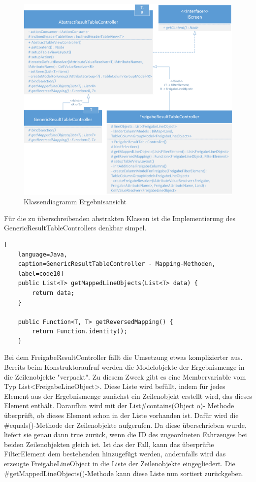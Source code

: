 \begin{figure}[H]
 \centering
 \includegraphics[width=1.0\textwidth]{grafiken/Class_ResultTable.png}
 \caption{Klassendiagramm Ergebnisansicht}
 \label{fig:tabelle4}
\end{figure}

Für die zu überschreibenden abstrakten Klassen ist die Implementierung des GenericResultTableControllers denkbar simpel.


\begin{lstlisting}[
    language=Java,
    caption=GenericResultTableController - Mapping-Methoden,
    label=code10]
	public List<T> getMappedLineObjects(List<T> data) {
		return data;
	}

	public Function<T, T> getReversedMapping() {
		return Function.identity();
	}
\end{lstlisting}

Bei dem FreigabeResultController fällt die Umsetzung etwas komplizierter aus. Bereits beim Konstruktoraufruf werden die Modelobjekte der Ergebnismenge in die Zeilenobjekte "verpackt". Zu diesem Zweck gibt es eine Membervariable vom Typ List<FreigabeLineObject>. Diese Liste wird befüllt, indem für jedes Element aus der Ergebnismenge zunächst ein Zeilenobjekt erstellt wird, das dieses Element enthält. Daraufhin wird mit der List\#contains(Object o)- Methode überprüft, ob dieses Element schon in der Liste vorhanden ist. Dafür wird die \#equals()-Methode der Zeilenobjekte aufgerufen. Da diese überschrieben wurde, liefert sie genau dann true zurück, wenn die ID des zugeordneten Fahrzeuges bei beiden Zeilenobjekten gleich ist. Ist das der Fall, kann das überprüfte FilterElement dem bestehenden hinzugefügt werden, andernfalls wird das erzeugte FreigabeLineObject in die Liste der Zeilenobjekte eingegliedert. Die \#getMappedLineObjects()-Methode kann diese Liste nun sortiert zurückgeben.

